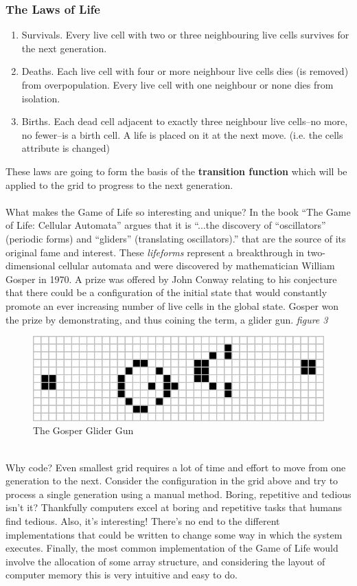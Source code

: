 \documentclass[11pt]{article} %
\begin{document}
\subsubsection*{The Laws of Life}
\begin{enumerate}
\item Survivals. Every live cell with two or three neighbouring live cells survives for the next generation.
\item Deaths. Each live cell with four or more neighbour live cells dies (is removed) from overpopulation. Every live cell with one neighbour or none dies from isolation.
\item Births. Each dead cell adjacent to exactly three neighbour live cells--no more, no fewer--is a birth cell. A life is placed on it at the next move. (i.e. the cells attribute is changed) \cite[Gardner, 1970]{ref7}
\end{enumerate}
These laws are going to form the basis of the {\bf transition function} which will be applied to the grid to progress to the next generation.\\
\\What makes the Game of Life so interesting and unique? In the book ``The Game of Life: Cellular Automata'' \cite[Bays, 2010, p1]{ref8} argues that it is ``...the discovery of ``oscillators'' (periodic forms) and ``gliders'' (translating oscillators).'' that are the source of its original fame and interest. These {\it lifeforms} represent a breakthrough in two-dimensional cellular automata and were discovered by mathematician William Gosper in 1970. A prize was offered by John Conway relating to his conjecture that there could be a configuration of the initial state that would constantly promote an ever increasing number of live cells in the global state. Gosper won the prize by demonstrating, and thus coining the term, a glider gun. {\it figure 3}\\
\begin{figure}[h]
\centering
\includegraphics[scale=0.5]{gosper}
\caption{The Gosper Glider Gun}
\label{fig: Gosper}
\end{figure}
\\Why code? Even smallest grid requires a lot of time and effort to move from one generation to the next. Consider the configuration in the grid above and try to process a single generation using a manual method. Boring, repetitive and tedious isn't it? Thankfully computers excel at boring and repetitive tasks that humans find tedious. Also, it's interesting! There's no end to the different implementations that could be written to change some way in which the system executes. Finally, the most common implementation of the Game of Life would involve the allocation of some array structure, and considering the layout of computer memory this is very intuitive and easy to do.\\
\end{document}
